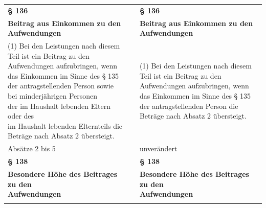 \documentclass[10pt,a4paper,landscape]{article}
\begin{document}
\begin{longtable}{|L{8.2cm}|L{8.2cm}|L{8.2cm}|}
\hhline{|---|}
\textbf{\S{} 136} &  & \textbf{\S{} 136} \\
\hhline{|---|}
\textbf{Beitrag aus Einkommen zu den  \newline Aufwendungen} &  & \textbf{Beitrag aus Einkommen zu den  \newline Aufwendungen} \\
\hhline{|---|}
(1) Bei den Leistungen nach diesem Teil ist  \newline ein Beitrag zu den Aufwendungen  \newline aufzubringen, wenn das Einkommen im  \newline Sinne des \S{} 135 der antragstellenden  \newline Person \textcolor{diffred}{sowie bei minderjährigen Personen  \newline der im Haushalt lebenden Eltern oder des  \newline im Haushalt lebenden Elternteils} die  \newline Beträge nach Absatz 2 übersteigt. &  & (1) Bei den Leistungen nach diesem Teil ist  \newline ein Beitrag zu den Aufwendungen  \newline aufzubringen, wenn das Einkommen im  \newline Sinne des \S{} 135 der antragstellenden  \newline Person  die  \newline Beträge nach Absatz 2 übersteigt. \\
\hhline{|---|}
Absätze 2 bis 5 &  & unverändert \\
\hhline{|---|}
\textbf{\S{} 138} &  & \textbf{\S{} 138} \\
\hhline{|---|}
\textbf{Besondere Höhe des Beitrages zu den  \newline Aufwendungen} &  & \textbf{Besondere Höhe des Beitrages zu den  \newline Aufwendungen} \\
\hhline{|---|}

\end{longtable}
\end{document}
